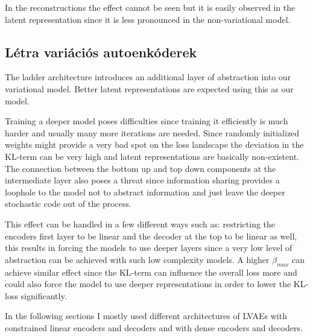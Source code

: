 \documentclass[12pt, english]{article}
\begin{document}
\vspace{4mm}

\par In the reconstructions the effect cannot be seen but it is easily observed in the latent representation since it is less pronounced in the non-variational model.

\newpage

\subsection{Létra variációs autoenkóderek}

\vspace{5mm}

\par The ladder architecture introduces an additional layer of abstraction into our variational model. Better latent representations are expected using this as our model.

\vspace{4mm}

\par Training a deeper model poses difficulties since training it efficiently is much harder and usually many more iterations are needed. Since randomly initialized weights might provide a very bad spot on the loss landscape the deviation in the KL-term can be very high and latent representations are basically non-existent. The connection between the bottom up and top down components at the intermediate layer also poses a threat since information sharing provides a loophole to the model not to abstract information and just leave the deeper stochastic code out of the process. 

\vspace{4mm}

\par This effect can be handled in a few different ways such as: restricting the encoders first layer to be linear and the decoder at the top to be linear as well, this results in forcing the models to use deeper layers since a very low level of abstraction can be achieved with such low complexity models. A higher $\beta_{max}$ can achieve similar effect since the KL-term can influence the overall loss more and could also force the model to use deeper representations in order to lower the KL-loss significantly. 

\vspace{4mm}

\par In the following sections I mostly used different architectures of LVAEs with constrained linear encoders and decoders and with dense encoders and decoders.
\end{document}
